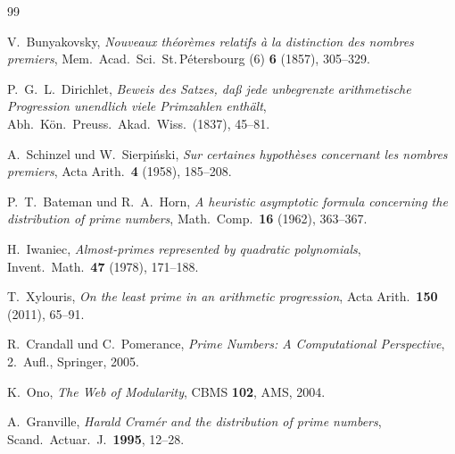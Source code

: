 \documentclass[12pt,a4paper]{amsart}
\theoremstyle{definition}
\theoremstyle{remark}
\begin{document}
\begin{thebibliography}{99}

V.\ Bunyakovsky,
\textit{Nouveaux théorèmes relatifs à la distinction des nombres premiers},
Mem.\ Acad.\ Sci.\ St.\,Pétersbourg (6) \textbf{6} (1857), 305--329.

P.\ G.\ L.\ Dirichlet,
\textit{Beweis des Satzes, daß jede unbegrenzte arithmetische Progression
unendlich viele Primzahlen enthält},
Abh.\ Kön.\ Preuss.\ Akad.\ Wiss.\ (1837), 45--81.

A.\ Schinzel und W.\ Sierpiński,
\textit{Sur certaines hypothèses concernant les nombres premiers},
Acta Arith.\ \textbf{4} (1958), 185--208.

P.\ T.\ Bateman und R.\ A.\ Horn,
\textit{A heuristic asymptotic formula concerning the distribution of prime numbers},
Math.\ Comp.\ \textbf{16} (1962), 363--367.

H.\ Iwaniec,
\textit{Almost-primes represented by quadratic polynomials},
Invent.\ Math.\ \textbf{47} (1978), 171--188.

T.\ Xylouris,
\textit{On the least prime in an arithmetic progression},
Acta Arith.\ \textbf{150} (2011), 65--91.

R.\ Crandall und C.\ Pomerance,
\textit{Prime Numbers: A Computational Perspective},
2.\ Aufl., Springer, 2005.

K.\ Ono,
\textit{The Web of Modularity},
CBMS \textbf{102}, AMS, 2004.

A.\ Granville,
\textit{Harald Cramér and the distribution of prime numbers},
Scand.\ Actuar.\ J.\ \textbf{1995}, 12--28.

\end{thebibliography}
\end{document}
